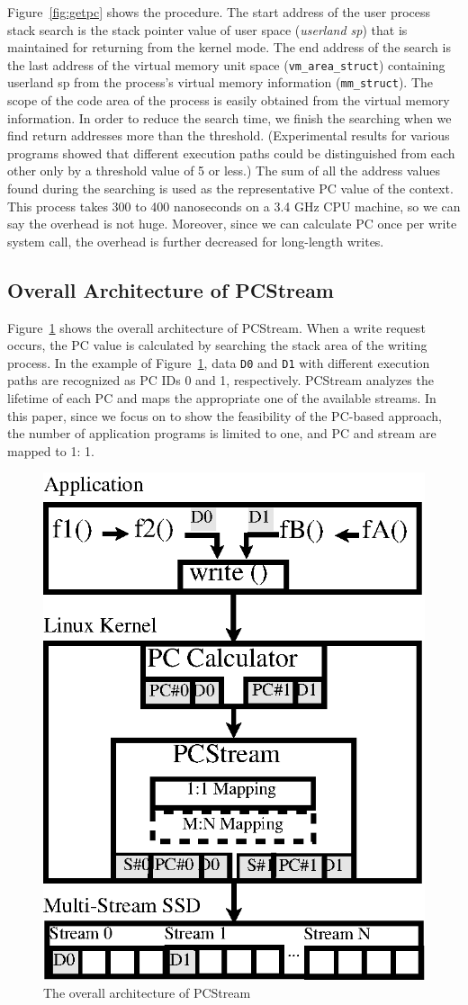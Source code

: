 Figure~\ref{fig:getpc} shows the procedure. 
The start address of the user process stack search is the stack pointer value of user space ({\it userland sp})
that is maintained for returning from the kernel mode. 
The end address of the search is the last address of the virtual memory unit space ({\tt vm\_area\_struct}) 
containing userland sp from the process's virtual memory information ({\tt mm\_struct}). 
The scope of the code area of the process is easily obtained from the virtual memory information. 
In order to reduce the search time, we finish the searching 
when we find return addresses more than the threshold.
(Experimental results for various programs showed that different execution paths could be distinguished 
from each other only by a threshold value of 5 or less.)
The sum of all the address values found during the searching is used 
as the representative PC value of the context.
This process takes 300 to 400 nanoseconds on a 3.4 GHz CPU machine, 
so we can say the overhead is not huge.
Moreover, since we can calculate PC once per write system call,
the overhead is further decreased for long-length writes.


\subsection{Overall Architecture of PCStream}
Figure~\ref{fig:architecture} shows the overall architecture of PCStream.
When a write request occurs, the PC value is calculated by searching the stack area of the writing process.
In the example of Figure~\ref{fig:architecture}, data {\tt D0} and {\tt D1} with 
different execution paths are recognized as PC IDs 0 and 1, respectively.
PCStream analyzes the lifetime of each PC and maps the appropriate one of the available streams.
In this paper, since we focus on to show the feasibility of the PC-based approach, 
the number of application programs is limited to one, 
and PC and stream are mapped to 1: 1.

\begin{figure}[t]
	\centering
	\includegraphics[width=0.5\linewidth]{figure/architecture}
	\caption{The overall architecture of PCStream}
	\label{fig:architecture}
	\vspace{-20pt}
\end{figure}


